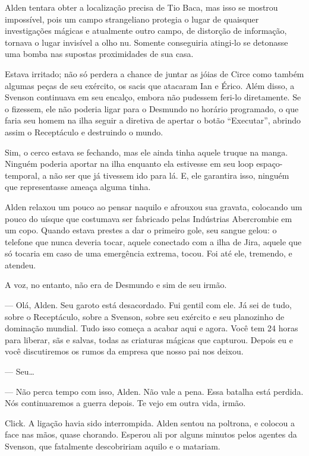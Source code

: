 Alden tentara obter a localização precisa de Tio Baca, mas isso se
mostrou impossível, pois um campo strangeliano protegia o lugar de
quaisquer investigações mágicas e atualmente outro campo, de distorção
de informação, tornava o lugar invisível a olho nu. Somente conseguiria
atingi-lo se detonasse uma bomba nas supostas proximidades de sua casa.

Estava irritado; não só perdera a chance de juntar as jóias de Circe
como também algumas peças de seu exército, os sacis que atacaram Ian e
Érico. Além disso, a Svenson continuava em seu encalço, embora não
pudessem feri-lo diretamente. Se o fizessem, ele não poderia ligar para
o Desmundo no horário programado, o que faria seu homem na ilha seguir a
diretiva de apertar o botão “Executar”, abrindo assim o Receptáculo e
destruindo o mundo.

Sim, o cerco estava se fechando, mas ele ainda tinha aquele truque na
manga.  Ninguém poderia aportar na ilha enquanto ela estivesse em seu
loop espaço-temporal, a não ser que já tivessem ido para lá. E, ele
garantira isso, ninguém que representasse ameaça alguma tinha.

Alden relaxou um pouco ao pensar naquilo e afrouxou sua gravata,
colocando um pouco do uísque que costumava ser fabricado pelas
Indústrias Abercrombie em um copo. Quando estava prestes a dar o
primeiro gole, seu sangue gelou: o telefone que nunca deveria tocar,
aquele conectado com a ilha de Jira, aquele que só tocaria em caso de
uma emergência extrema, tocou. Foi até ele, tremendo, e atendeu.

A voz, no entanto, não era de Desmundo e sim de seu irmão.

--- Olá, Alden. Seu garoto está desacordado. Fui gentil com ele. Já sei
de tudo, sobre o Receptáculo, sobre a Svenson, sobre seu exército e seu
planozinho de dominação mundial. Tudo isso começa a acabar aqui e agora.
Você tem 24 horas para liberar, sãs e salvas, todas as criaturas mágicas
que capturou. Depois eu e você discutiremos os rumos da empresa que
nosso pai nos deixou.

--- Seu\ldots

--- Não perca tempo com isso, Alden. Não vale a pena. Essa batalha está
perdida.  Nós continuaremos a guerra depois. Te vejo em outra vida,
irmão.

Click. A ligação havia sido interrompida. Alden sentou na poltrona, e
colocou a face nas mãos, quase chorando. Esperou ali por alguns minutos
pelos agentes da Svenson, que fatalmente descobririam aquilo e o
matariam.

